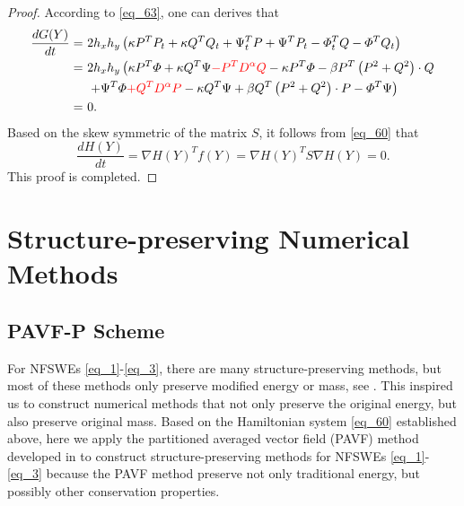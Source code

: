 \documentclass[preprint,compress,3p,10pt,fleqn]{elsarticle}
\numberwithin{equation}{section}
\begin{document}
\begin{proof}
According to \eqref{eq_63}, one can derives that
\begin{align}\label{eq_64}
\frac{d G(Y)}{d t}=&~2 h_{x} h_{y}\left(\kappa P^{T}P_t+\kappa Q^{T}Q_t+\Psi^{T}_t P+\Psi^{T}P_{t}-\varPhi^{T}_t Q-\varPhi^{T}Q_{t}\right)\nonumber\\
=&~2 h_{x} h_{y}\left(\kappa P^{T}\varPhi+\kappa Q^{T}\Psi \textcolor[rgb]{1.00,0.00,0.00}{- P^{T}D^{\alpha}Q}-\kappa P^{T}\varPhi-\beta P^{T}\left( P^{2}+Q^{2}\right)\cdot Q\right.\nonumber\\
&~\left.+\Psi^{T}\varPhi\textcolor[rgb]{1.00,0.00,0.00}{+Q^{T}D^{\alpha}P}-\kappa Q^{T}\Psi+\beta Q^{T}\left( P^{2}+Q^{2}\right)\cdot P-\varPhi^{T}\Psi\right)\nonumber\\
=&~0.
\end{align}
Based on the skew symmetric of the matrix $S$, it follows from \eqref{eq_60} that
\begin{equation}\label{eq_65}
\frac{d H(Y)}{d t}=\nabla H(Y)^{T} f(Y)=\nabla H(Y)^{T} S \nabla H(Y)=0 .
\end{equation}
This proof is completed.
\end{proof}


\section{Structure-preserving Numerical Methods}\label{Section 3}
\subsection{PAVF-P Scheme}

For NFSWEs \eqref{eq_1}-\eqref{eq_3}, there are many structure-preserving methods, but most of these methods only preserve modified energy or mass, see \cite{liFastEnergyConserving2018,huEfficientEnergyPreserving2022}. This inspired us to construct numerical methods that not only preserve the original energy, but also preserve original mass. Based on the Hamiltonian system \eqref{eq_60} established above, here we apply the partitioned averaged vector field (PAVF) method developed in  \cite{caiPartitionedAveragedVector2018} to construct structure-preserving methods for NFSWEs \eqref{eq_1}-\eqref{eq_3} because the PAVF method preserve not only traditional energy, but possibly other conservation properties.
\end{document}

